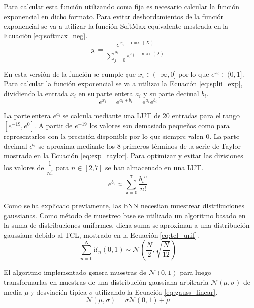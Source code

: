 Para calcular esta función utilizando coma fija es necesario calcular la función exponencial en dicho formato. Para evitar desbordamientos de la función exponencial se va a utilizar la función SoftMax equivalente mostrada en la Ecuación \ref{eq:softmax_neg}.
\begin{equation} \label{eq:softmax_neg}
y_i = \dfrac{e^{x_i - \max(X)}}{\sum_{j = 0}^N e^{x_j - \max(X)}}
\end{equation}

En esta versión de la función se cumple que $x_i \in (-\infty, 0]$ por lo que $e^{x_i} \in (0,1]$. Para calcular la función exponencial se va a utilizar la Ecuación \ref{eq:split_exp}, dividiendo la entrada $x_i$ en su parte entera $a_i$ y su parte decimal $b_i$.
\begin{equation} \label{eq:split_exp}
e^{x_i} = e^{a_i+b_i} = e^{a_i} e^{b_i}
\end{equation}

La parte entera $e^{a_i}$ se calcula mediante una LUT de 20 entradas para el rango $[e^{-19}, e^{0}]$. A partir de $e^{-19}$ los valores son demasiado pequeños como para representarlos con la precisión disponible por lo que siempre valen $0$. La parte decimal $e^{b_i}$ se aproxima mediante los 8 primeros términos de la serie de Taylor mostrada en la Ecuación \ref{eq:exp_taylor}. Para optimizar y evitar las divisiones los valores de $\dfrac{1}{n!}$ para $n \in [2,7]$ se han almacenado en una LUT.
\begin{equation} \label{eq:exp_taylor}
e^{b_i} \approx \sum_{n=0}^{7} \dfrac{{b_i}^n}{n!}
\end{equation}

Como se ha explicado previamente, las BNN necesitan muestrear distribuciones gaussianas. Como método de muestreo base se utilizada un algoritmo basado en la suma de distribuciones uniformes, dicha suma se aproximan a una distribución gaussiana debido al TCL, mostrado en la Ecuación \ref{eq:tcl_unif}.
\begin{equation} \label{eq:tcl_unif}
\sum_{n=0}^{N} \mathcal{U}_n(0,1) \sim \mathcal{N} \left( \dfrac{N}{2}, \sqrt{\dfrac{N}{12}} \right)
\end{equation}

El algoritmo implementado genera muestras de $\mathcal{N}(0,1)$ para luego transformarlas en muestras de una distribución gaussiana arbitraria $\mathcal{N}(\mu, \sigma)$ de media $\mu$ y desviación típica $\sigma$ utilizando la Ecuación \ref{eq:gauss_linear}.
\begin{equation} \label{eq:gauss_linear}
\mathcal{N}(\mu, \sigma) = \sigma \mathcal{N}(0,1) + \mu
\end{equation}


